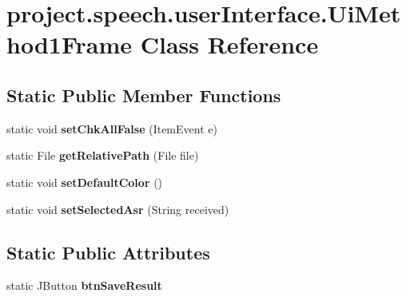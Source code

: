 \section{project.\+speech.\+user\+Interface.\+Ui\+Method1\+Frame Class Reference}
\label{classproject_1_1speech_1_1user_interface_1_1_ui_method1_frame}
\subsection*{Static Public Member Functions}
\begin{DoxyCompactItemize}
\item 
static void {\bf set\+Chk\+All\+False} (Item\+Event e)
\item 
static File {\bf get\+Relative\+Path} (File file)
\item 
static void {\bf set\+Default\+Color} ()
\item 
static void {\bf set\+Selected\+Asr} (String received)
\end{DoxyCompactItemize}
\subsection*{Static Public Attributes}
\begin{DoxyCompactItemize}
\item 
static J\+Button {\bf btn\+Save\+Result}
\end{DoxyCompactItemize}
